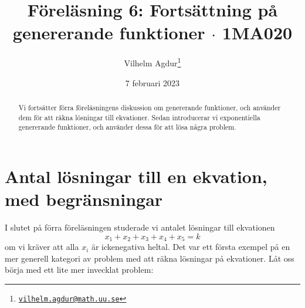 \documentclass[nobib]{tufte-handout}
\title{Föreläsning 6: Fortsättning på genererande funktioner $\cdot$ 1MA020}
\author[Vilhelm Agdur]{Vilhelm Agdur\thanks{\href{mailto:vilhelm.agdur@math.uu.se}{\nolinkurl{vilhelm.agdur@math.uu.se}}}}
\date{7 februari 2023}
\begin{document}

\maketitle%

\begin{abstract}
\noindent
Vi fortsätter förra föreläsningens diskussion om genererande funktioner, och använder dem för att räkna lösningar till ekvationer. Sedan introducerar vi exponentiella genererande funktioner, och använder dessa för att lösa några problem.
\end{abstract}

\section{Antal lösningar till en ekvation, med begränsningar}

I slutet på förra föreläsningen studerade vi antalet lösningar till ekvationen
$$x_1 + x_2 + x_3 + x_4 + x_5 = k$$
om vi kräver att alla $x_i$ är ickenegativa heltal. Det var ett första exempel på en mer generell kategori av problem med att räkna lösningar på ekvationer. Låt oss börja med ett lite mer invecklat problem:
\end{document}
